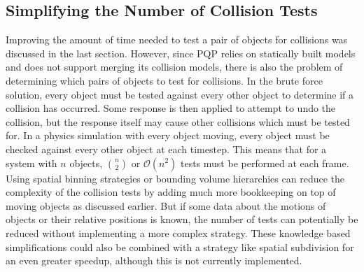 \documentclass{article} %
\begin{document}
\subsection{Simplifying the Number of Collision Tests}
Improving the amount of time needed to test a pair of objects for collisions was discussed in the last section.  However, since PQP relies on statically built models and does not support merging its collision models, there is also the problem of determining which pairs of objects to test for collisions.  In the brute force solution, every object must be tested against every other object to determine if a collision has occurred.  Some response is then applied to attempt to undo the collision, but the response itself may cause other collisions which must be tested for. In a physics simulation with every object moving, every object must be checked against every other object at each timestep. This means that for a system with $n$ objects, ${n \choose 2}$ or $\mathcal{O}(n^2)$ tests must be performed at each frame.  Using spatial binning strategies or bounding volume hierarchies can reduce the complexity of the collision tests by adding much more bookkeeping on top of moving objects as discussed earlier.  But if some data about the motions of objects or their relative positions is known, the number of tests can potentially be reduced without implementing a more complex strategy.  These knowledge based simplifications could also be combined with a strategy like spatial subdivision for an even greater speedup, although this is not currently implemented.
\end{document}
